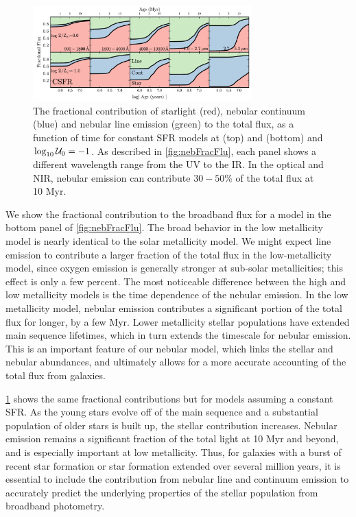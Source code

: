 \begin{figure}[!htbp]
  \begin{centering}
    \includegraphics[width=0.75\textwidth]{manuscript/chapter2/f13.pdf}
    \caption{The fractional contribution of starlight (red), nebular continuum (blue) and nebular line emission (green) to the total flux, as a function of time for constant SFR models at  (top) and  (bottom) and $\log_{10} \mathcal{U}_0=-1$. As described in \ref{fig:nebFracFlu}, each panel shows a different wavelength range from the UV to the IR. In the optical and NIR, nebular emission can contribute $30-50\%$ of the total flux at 10 Myr.}
    \label{fig:fracfluCSFR}
  \end{centering}
\end{figure}
We show the fractional contribution to the broadband flux for a  model in the bottom panel of \ref{fig:nebFracFlu}. The broad behavior in the low metallicity model is nearly identical to the solar metallicity model. We might expect line emission to contribute a larger fraction of the total flux in the low-metallicity model, since oxygen emission is generally stronger at sub-solar metallicities; this effect is only a few percent. The most noticeable difference between the high and low metallicity models is the time dependence of the nebular emission. In the low metallicity model, nebular emission contributes a significant portion of the total flux for longer, by a few Myr. Lower metallicity stellar populations have extended main sequence lifetimes, which in turn extends the timescale for nebular emission. This is an important feature of our nebular model, which links the stellar and nebular abundances, and ultimately allows for a more accurate accounting of the total flux from galaxies.

\ref{fig:fracfluCSFR} shows the same fractional contributions but for models assuming a constant SFR. As the young stars evolve off of the main sequence and a substantial population of older stars is built up, the stellar contribution increases. Nebular emission remains a significant fraction of the total light at 10 Myr and beyond, and is especially important at low metallicity. Thus, for galaxies with a burst of recent star formation or star formation extended over several million years, it is essential to include the contribution from nebular line and continuum emission to accurately predict the underlying properties of the stellar population from broadband photometry.

